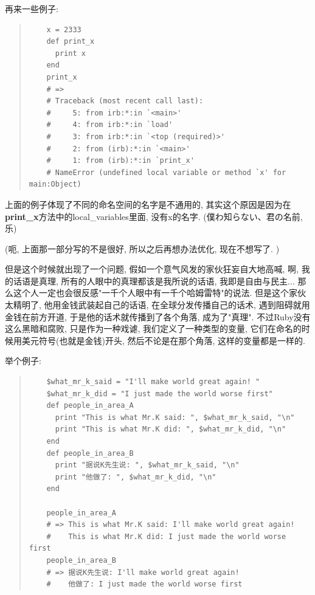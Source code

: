 再来一些例子: 

\begin{quotation}
  \begin{verbatim}
    x = 2333
    def print_x
      print x
    end
    print_x
    # => 
    # Traceback (most recent call last):
    #     5: from irb:*:in `<main>'
    #     4: from irb:*:in `load'
    #     3: from irb:*:in `<top (required)>'
    #     2: from (irb):*:in `<main>'
    #     1: from (irb):*:in `print_x'
    # NameError (undefined local variable or method `x' for main:Object)
  \end{verbatim}
\end{quotation}

上面的例子体现了不同的命名空间的名字是不通用的, 其实这个原因是因为在\textbf{print\_x}方法中的local\_variables里面, 没有x的名字. (僕わ知らない、君の名前, 乐)

(呃, 上面那一部分写的不是很好, 所以之后再想办法优化, 现在不想写了. )

但是这个时候就出现了一个问题, 假如一个意气风发的家伙狂妄自大地高喊, 啊, 我的话语是真理, 所有的人眼中的真理都该是我所说的话语, 我即是自由与民主... 那么这个人一定也会很反感"一千个人眼中有一千个哈姆雷特"的说法. 但是这个家伙太精明了, 他用金钱武装起自己的话语, 在全球分发传播自己的话术, 遇到阻碍就用金钱在前方开道, 于是他的话术就传播到了各个角落, 成为了"真理". 不过Ruby没有这么黑暗和腐败, 只是作为一种戏谑, 我们定义了一种类型的变量, 它们在命名的时候用美元符号(也就是金钱)开头, 然后不论是在那个角落, 这样的变量都是一样的. 

举个例子: 

\begin{quotation}
  \begin{verbatim}
    $what_mr_k_said = "I'll make world great again! "
    $what_mr_k_did = "I just made the world worse first"
    def people_in_area_A
      print "This is what Mr.K said: ", $what_mr_k_said, "\n"
      print "This is what Mr.K did: ", $what_mr_k_did, "\n"
    end
    def people_in_area_B
      print "据说K先生说: ", $what_mr_k_said, "\n"
      print "他做了: ", $what_mr_k_did, "\n"
    end

    people_in_area_A
    # => This is what Mr.K said: I'll make world great again! 
    #    This is what Mr.K did: I just made the world worse first
    people_in_area_B
    # => 据说K先生说: I'll make world great again! 
    #    他做了: I just made the world worse first
  \end{verbatim}
\end{quotation}

